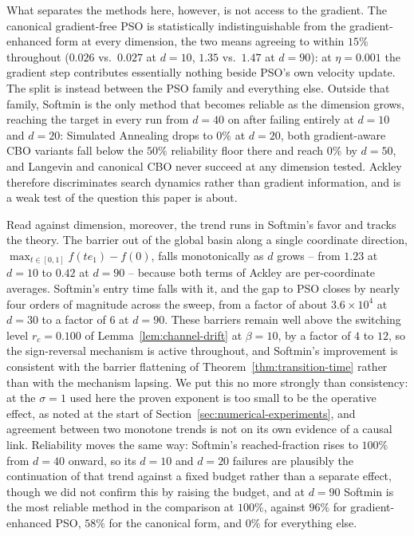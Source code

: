\documentclass{article} %
\theoremstyle{plain}
\theoremstyle{definition}
\theoremstyle{remark}
\begin{document}
What separates the methods here, however, is not access to the gradient. The canonical gradient-free PSO is statistically indistinguishable from the gradient-enhanced form at every dimension, the two means agreeing to within $15\%$ throughout ($0.026$ vs.\ $0.027$ at $d=10$, $1.35$ vs.\ $1.47$ at $d=90$): at $\eta=0.001$ the gradient step contributes essentially nothing beside PSO's own velocity update. The split is instead between the PSO family and everything else. Outside that family, Softmin is the only method that becomes reliable as the dimension grows, reaching the target in every run from $d=40$ on after failing entirely at $d=10$ and $d=20$: Simulated Annealing drops to $0\%$ at $d=20$, both gradient-aware CBO variants fall below the $50\%$ reliability floor there and reach $0\%$ by $d=50$, and Langevin and canonical CBO never succeed at any dimension tested. Ackley therefore discriminates search dynamics rather than gradient information, and is a weak test of the question this paper is about.

Read against dimension, moreover, the trend runs in Softmin's favor and tracks the theory. The barrier out of the global basin along a single coordinate direction, $\max_{t\in[0,1]}f(te_1)-f(0)$, falls monotonically as $d$ grows -- from $1.23$ at $d=10$ to $0.42$ at $d=90$ -- because both terms of Ackley are per-coordinate averages. Softmin's entry time falls with it, and the gap to PSO closes by nearly four orders of magnitude across the sweep, from a factor of about $3.6\times10^4$ at $d=30$ to a factor of $6$ at $d=90$. These barriers remain well above the switching level $r_c=0.100$ of Lemma~\ref{lem:channel-drift} at $\beta=10$, by a factor of $4$ to $12$, so the sign-reversal mechanism is active throughout, and Softmin's improvement is consistent with the barrier flattening of Theorem~\ref{thm:transition-time} rather than with the mechanism lapsing. We put this no more strongly than consistency: at the $\sigma=1$ used here the proven exponent is too small to be the operative effect, as noted at the start of Section~\ref{sec:numerical-experiments}, and agreement between two monotone trends is not on its own evidence of a causal link. Reliability moves the same way: Softmin's reached-fraction rises to $100\%$ from $d=40$ onward, so its $d=10$ and $d=20$ failures are plausibly the continuation of that trend against a fixed budget rather than a separate effect, though we did not confirm this by raising the budget, and at $d=90$ Softmin is the most reliable method in the comparison at $100\%$, against $96\%$ for gradient-enhanced PSO, $58\%$ for the canonical form, and $0\%$ for everything else.
\end{document}
